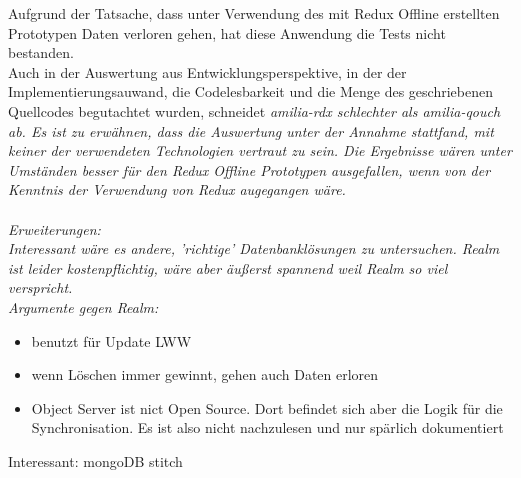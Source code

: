 Aufgrund der Tatsache, dass unter Verwendung des mit Redux Offline erstellten Prototypen Daten verloren gehen, hat diese Anwendung die Tests nicht bestanden.\\
Auch in der Auswertung aus Entwicklungsperspektive, in der der Implementierungsauwand, die Codelesbarkeit und die Menge des geschriebenen Quellcodes begutachtet wurden, schneidet \it{amilia-rdx} schlechter als \it{amilia-qouch} ab.
Es ist zu erwähnen, dass die Auswertung unter der Annahme stattfand, mit keiner der verwendeten Technologien vertraut zu sein.
Die Ergebnisse wären unter Umständen besser für den Redux Offline Prototypen ausgefallen, wenn von der Kenntnis der Verwendung von Redux augegangen wäre.\\\\
%
%
%

Erweiterungen:\\
Interessant wäre es andere, 'richtige' Datenbanklösungen zu untersuchen. 
Realm ist leider kostenpflichtig, wäre aber äußerst spannend weil Realm so viel verspricht.\\
Argumente gegen Realm:
\begin{itemize}
  \item benutzt für Update LWW
  \item wenn Löschen immer gewinnt, gehen auch Daten erloren
  \item Object Server ist nict Open Source. Dort befindet sich aber die Logik für die Synchronisation. Es ist also nicht nachzulesen und nur spärlich dokumentiert
\end{itemize}
%
%
%
Interessant: mongoDB stitch ~\cite{stitch}